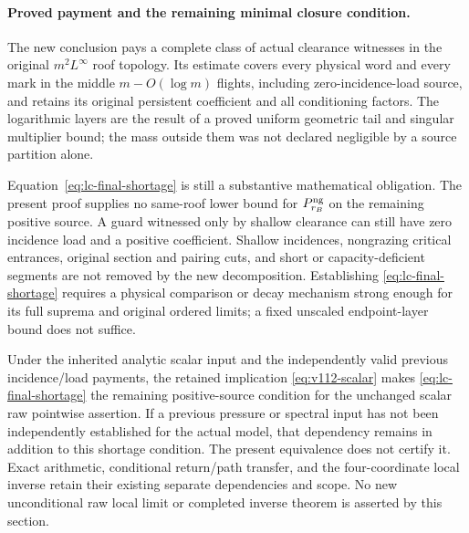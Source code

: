 \paragraph{Proved payment and the remaining minimal closure condition.}
The new conclusion pays a complete class of actual clearance witnesses
in the original $m^2L^\infty$ roof topology.  Its estimate covers every
physical word and every mark in the middle $m-O(\log m)$ flights,
including zero-incidence-load source, and retains its original
persistent coefficient and all conditioning factors.  The logarithmic
layers are the result of a proved uniform geometric tail and singular
multiplier bound; the mass outside them was not declared negligible by
a source partition alone.

Equation~\eqref{eq:lc-final-shortage} is still a substantive mathematical
obligation.  The present proof supplies no same-roof lower bound for
$P_{r_B}^{\rm ng}$ on the remaining positive source.  A guard witnessed
only by shallow clearance can still have zero incidence load and a
positive coefficient.  Shallow incidences, nongrazing critical entrances,
original section and pairing cuts, and short or capacity-deficient
segments are not removed by the new decomposition.  Establishing
\eqref{eq:lc-final-shortage} requires a physical comparison or decay
mechanism strong enough for its full suprema and original ordered
limits; a fixed unscaled endpoint-layer bound does not suffice.

Under the inherited analytic scalar input and the independently valid
previous incidence/load payments, the retained implication
\eqref{eq:v112-scalar} makes \eqref{eq:lc-final-shortage} the remaining
positive-source condition for the unchanged scalar raw pointwise
assertion.  If a previous pressure or spectral input has not been
independently established for the actual model, that dependency remains
in addition to this shortage condition.  The present equivalence does
not certify it.  Exact arithmetic, conditional return/path transfer,
and the four-coordinate local inverse retain their existing separate
dependencies and scope.  No new unconditional raw local limit or
completed inverse theorem is asserted by this section.
